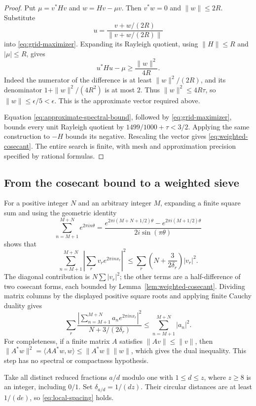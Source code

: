 \begin{proof}
Put $\mu=v^*Hv$ and $w=Hv-\mu v$.  Then $v^*w=0$ and
$\|w\|\leq2R$.  Substitute
\[
 u=\frac{v+w/(2R)}{\|v+w/(2R)\|}
\]
into \eqref{eq:grid-maximizer}.  Expanding its Rayleigh quotient,
using $\|H\|\leq R$ and $|\mu|\leq R$, gives
\[
 u^*Hu-\mu\geq\frac{\|w\|^2}{4R}.
\]
Indeed the numerator of the difference is at least
$\|w\|^2/(2R)$, and its denominator
$1+\|w\|^2/(4R^2)$ is at most $2$.
Thus $\|w\|^2\leq4R\tau$, so $\|w\|\leq\epsilon/5<\epsilon$.
This is the approximate vector required above.

Equation \eqref{eq:approximate-spectral-bound}, followed by
\eqref{eq:grid-maximizer}, bounds every unit Rayleigh quotient by
$1499/1000+\tau<3/2$.  Applying the same construction to $-H$
bounds its negative.  Rescaling the vector gives
\eqref{eq:weighted-cosecant}.  The entire search is finite, with
mesh and approximation precision specified by rational formulas.
\end{proof}

\subsection{From the cosecant bound to a weighted sieve}

For a positive integer $N$ and an arbitrary integer $M$, expanding
a finite square sum and using the geometric identity
\[
 \sum_{n=M+1}^{M+N}e^{2\pi in\theta}
 =\frac{e^{2\pi i(M+N+1/2)\theta}
             -e^{2\pi i(M+1/2)\theta}}
        {2i\sin(\pi\theta)}
\]
shows that
\[
 \sum_{n=M+1}^{M+N}\left|\sum_rv_re^{2\pi inx_r}\right|^2
 \leq\sum_r\left(N+\frac3{2\delta_r}\right)|v_r|^2.
\]
The diagonal contribution is $N\sum|v_r|^2$; the other terms are a
half-difference of two cosecant forms, each bounded by
Lemma~\ref{lem:weighted-cosecant}.  Dividing matrix columns by the
displayed positive square roots and applying finite Cauchy duality
gives
\begin{equation}
 \sum_r\frac{\left|\sum_{n=M+1}^{M+N}a_ne^{2\pi inx_r}\right|^2}
                  {N+3/(2\delta_r)}
 \leq\sum_{n=M+1}^{M+N}|a_n|^2.
 \label{eq:weighted-large-sieve}
\end{equation}
For completeness, if a finite matrix $A$ satisfies
$\|Av\|\leq\|v\|$, then
$\|A^*w\|^2=\langle AA^*w,w\rangle
\leq\|A^*w\|\|w\|$, which gives the dual inequality.
This step has no spectral or compactness hypothesis.

Take all distinct reduced fractions $a/d$ modulo one with
$1\leq d\leq z$, where $z\geq8$ is an integer, including $0/1$.
Set $\delta_{a/d}=1/(dz)$.  Their circular distances are at least
$1/(de)$, so \eqref{eq:local-spacing} holds.

